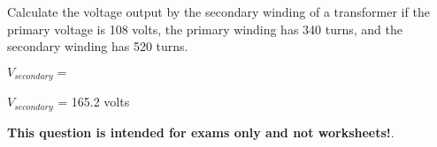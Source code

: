 

Calculate the voltage output by the secondary winding of a transformer if the primary voltage is 108 volts, the primary winding has 340 turns, and the secondary winding has 520 turns.

\vskip 10pt

$V_{secondary} =$

\vskip 10pt







$V_{secondary}$ = 165.2 volts 







{\bf This question is intended for exams only and not worksheets!}.



